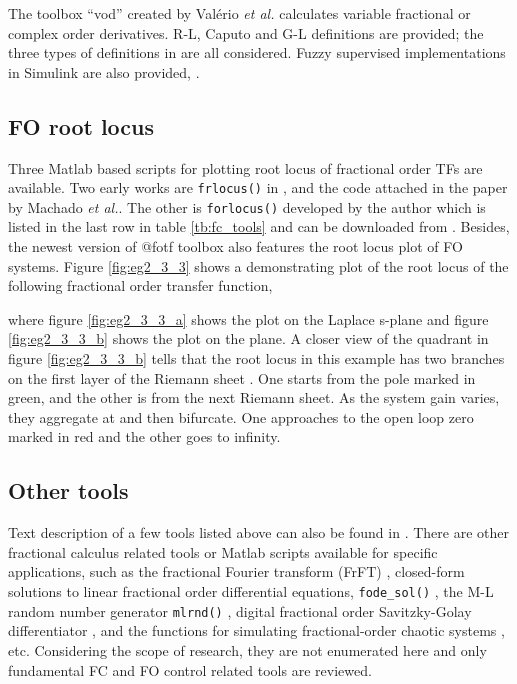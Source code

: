 \documentclass[11pt]{tCON2e}
\theoremstyle{plain}\newtheorem{theorem}{Theorem}
\theoremstyle{definition}
\theoremstyle{remark}
\begin{document}
The toolbox ``vod'' created by Val\'{e}rio \emph{et al.} calculates variable fractional or complex order derivatives. R-L, Caputo and G-L definitions are provided; the three types of definitions in \cite{ref:FVO_Lorenzo} are all considered. Fuzzy supervised implementations in Simulink are also provided, \cite{ref:FVO_Valerio}.



\subsection{FO root locus}
Three Matlab based scripts for plotting root locus of fractional order TFs are available. Two early works are {\tt frlocus()} in \cite{ref:flocus_matlab}, and the code attached in the paper \cite{ref:rlocus_Machado_with_code} by Machado \emph{et al.}. The other is {\tt forlocus()} developed by the author which is listed in the last row in table \ref{tb:fc_tools} and can be downloaded from \cite{ref:FO_RL_mine}. Besides, the newest version of @fotf toolbox also features the root locus plot of FO systems. Figure \ref{fig:eg2_3_3} shows a demonstrating plot of the root locus of the following fractional order transfer function,

where figure \ref{fig:eg2_3_3_a} shows the plot on the Laplace s-plane and figure \ref{fig:eg2_3_3_b} shows the plot on the  plane.
A closer view of the  quadrant in figure \ref{fig:eg2_3_3_b} tells that the root locus in this example has two branches on the first layer of the Riemann sheet \cite{ref:RiemannSurfaces, ref:RiemannSurfacesBook}. One starts from the pole marked in green, and the other is from the next Riemann sheet. As the system gain varies, they aggregate at  and then bifurcate. One approaches to the open loop zero marked in red and the other goes to infinity.






\subsection{Other tools}
Text description of a few tools listed above can also be found in \cite{ref:FO_in_Matlab_Petras}.
There are other fractional calculus related tools or Matlab scripts available for specific applications, such as the fractional Fourier transform (FrFT) \cite{ref:FrFT_book_2001, ref:FrFT_paper_2003}, closed-form solutions to linear fractional order differential equations, {\tt fode\_sol()} \cite{ref:Monje}, the M-L random number generator {\tt mlrnd()}  \cite{ref:mlrnd}, digital fractional order Savitzky-Golay differentiator \cite{ref:Dali_Golay_filter}, and the functions for simulating fractional-order chaotic systems \cite{ref:Petras2}, etc. Considering the scope of research, they are not enumerated here and only fundamental FC and FO control related tools are reviewed.
\end{document}
